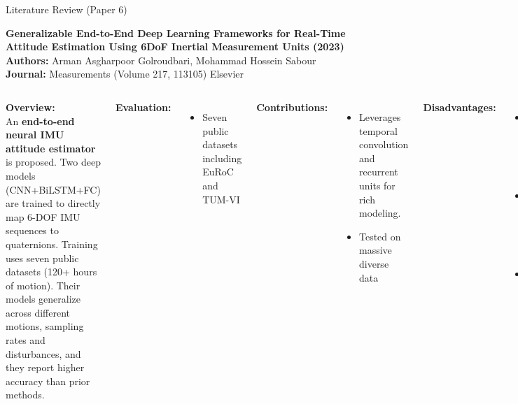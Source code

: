 \documentclass[aspectratio=169,xcolor=dvipsnames]{beamer}
\begin{document}
\begin{frame}{Literature Review (Paper 6)}

\textbf{Generalizable End-to-End Deep Learning Frameworks for Real-Time Attitude Estimation Using 6DoF Inertial Measurement Units (2023)} \hfill \textcolor{blue}{\cite{golroudbari2023cnn6DOF}}\\
\textbf{Authors:} Arman Asgharpoor Golroudbari, Mohammad Hossein Sabour \\
\textbf{Journal:} Measurements (Volume 217, 113105) Elsevier

\vspace{1em}
\scriptsize
\begin{columns}
    \textbf{Overview:}\\
    An \textbf{end-to-end neural IMU attitude estimator} is proposed. Two deep models (CNN+BiLSTM+FC) are trained to directly map 6-DOF IMU sequences to quaternions. Training uses seven public datasets (120+ hours of motion). Their models generalize across different motions, sampling rates and disturbances, and they report higher accuracy than prior methods. 

    \vspace{0.5em}
    \textbf{Evaluation:}
    \begin{itemize}
        \item Seven public datasets including EuRoC and TUM-VI
    \end{itemize}

    \textbf{Contributions:}
    \begin{itemize}
        \item Leverages temporal convolution and recurrent units for rich modeling.
        \item Tested on massive diverse data 
    \end{itemize}

    \vspace{0.5em}
    \textbf{Disadvantages:}
    \begin{itemize}
        \item Heavy models requiring long training. 
        \item \textbf{“Black box”}, so no physical insight. 
        \item Relies on availability of similar data during training.  
    \end{itemize}
\end{columns}

\end{frame}
\end{document}
